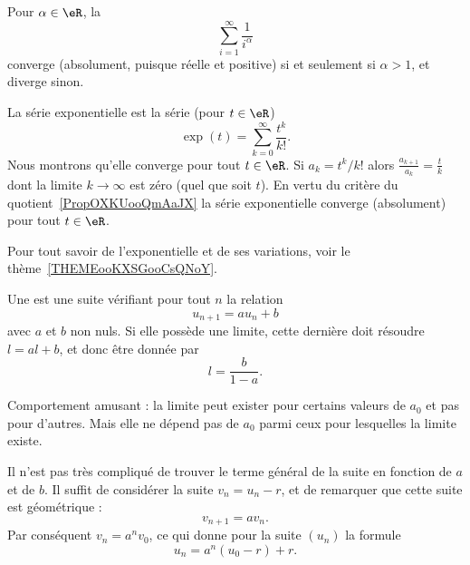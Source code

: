 \begin{example}       \label{EXooCTYNooCjYQvJ}
    Pour $\alpha \in \eR$, la 
    \begin{equation}        \label{EqSerRiem}
        \sum_{i=1}^\infty \frac1{i^\alpha}
    \end{equation}
    converge (absolument, puisque réelle et positive) si et seulement si $\alpha > 1$, et diverge sinon.
\end{example}

\begin{example} \label{ExIJMHooOEUKfj}
    La série exponentielle est la série (pour \( t\in \eR\))
    \begin{equation}
        \exp(t)=\sum_{k=0}^{\infty}\frac{ t^k }{ k! }.
    \end{equation}
    Nous montrons qu'elle converge pour tout \( t\in \eR\). Si \( a_k=t^k/k!\) alors \( \frac{ a_{k+1} }{ a_k }=\frac{ t }{ k }\) dont la limite \( k\to \infty\) est zéro (quel que soit \( t\)). En vertu du critère du quotient~\ref{PropOXKUooQmAaJX} la série exponentielle converge (absolument) pour tout \( t\in \eR\).

    Pour tout savoir de l'exponentielle et de ses variations, voir le thème~\ref{THEMEooKXSGooCsQNoY}.
\end{example}

\begin{example}
    Une  est une suite vérifiant pour tout \( n\) la relation
    \begin{equation}
        u_{n+1}=au_n+b
    \end{equation}
    avec \( a\) et \( b\) non nuls. Si elle possède une limite, cette dernière doit résoudre \( l=al+b\), et donc être donnée par
    \begin{equation}
        l=\frac{ b }{ 1-a }.
    \end{equation}

    Comportement amusant : la limite peut exister pour certains valeurs de \( a_0\) et pas pour d'autres. Mais elle ne dépend pas de \( a_0\) parmi ceux pour lesquelles la limite existe.

    Il n'est pas très compliqué de trouver le terme général de la suite en fonction de \( a\) et de \( b\). Il suffit de considérer la suite \( v_n=u_n-r\), et de remarquer que cette suite est géométrique :
    \begin{equation}
        v_{n+1}=av_n.
    \end{equation}
    Par conséquent \( v_n=a^nv_0\), ce qui donne pour la suite \( (u_n)\) la formule
    \begin{equation}
        u_n=a^n(u_0-r)+r.
    \end{equation}
\end{example}

